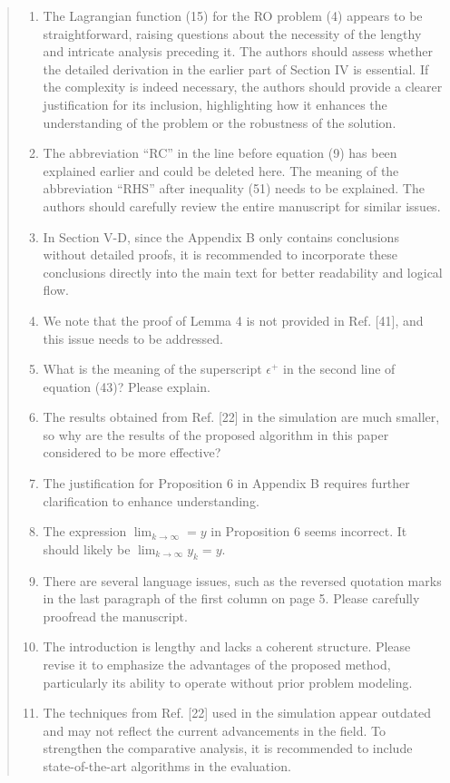 \documentclass[journal,twoside,web]{ieeecolor}
\begin{document}
\begin{quote}
\begin{enumerate}
\item The Lagrangian function (15) for the RO problem (4) appears to be straightforward, raising questions about the necessity of the lengthy and intricate analysis preceding it. The authors should assess whether the detailed derivation in the earlier part of Section IV is essential. If the complexity is indeed necessary, the authors should provide a clearer justification for its inclusion, highlighting how it enhances the understanding of the problem or the robustness of the solution.

\item The abbreviation ``RC'' in the line before equation (9) has been explained earlier and could be deleted here. The meaning of the abbreviation ``RHS'' after inequality (51) needs to be explained. The authors should carefully review the entire manuscript for similar issues.

\item In Section V-D, since the Appendix B only contains conclusions without detailed proofs, it is recommended to incorporate these conclusions directly into the main text for better readability and logical flow.

\item We note that the proof of Lemma 4 is not provided in Ref. [41], and this issue needs to be addressed.

\item What is the meaning of the superscript $\epsilon^+$ in the second line of equation (43)? Please explain.

\item The results obtained from Ref. [22] in the simulation are much smaller, so why are the results of the proposed algorithm in this paper considered to be more effective?

\item The justification for Proposition 6 in Appendix B requires further clarification to enhance understanding.

\item The expression $\lim_{k \to \infty}=y$ in Proposition 6 seems incorrect. It should likely be $\lim_{k \to \infty} y_k=y$.

\item There are several language issues, such as the reversed quotation marks in the last paragraph of the first column on page 5. Please carefully proofread the manuscript.

\item The introduction is lengthy and lacks a coherent structure. Please revise it to emphasize the advantages of the proposed method, particularly its ability to operate without prior problem modeling.

\item The techniques from Ref. [22] used in the simulation appear outdated and may not reflect the current advancements in the field. To strengthen the comparative analysis, it is recommended to include state-of-the-art algorithms in the evaluation.
\end{enumerate}
\end{quote}
\end{document}
